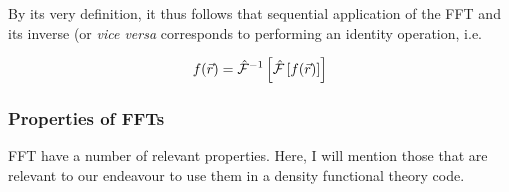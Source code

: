 By its very definition, it thus follows that sequential application of the FFT and its inverse (or \textit{vice versa} corresponds to performing an identity operation, i.e.

\begin{equation}
    f(\vec{r}) = \hat{\mathcal{F}}^{-1}\left[\hat{\mathcal{F}}\left[f(\vec{r})\right]\right]
\end{equation}

%
%
%
\subsubsection{Properties of FFTs}

FFT have a number of relevant properties. Here, I will mention those that are relevant to our endeavour to use them in a density functional theory code.


